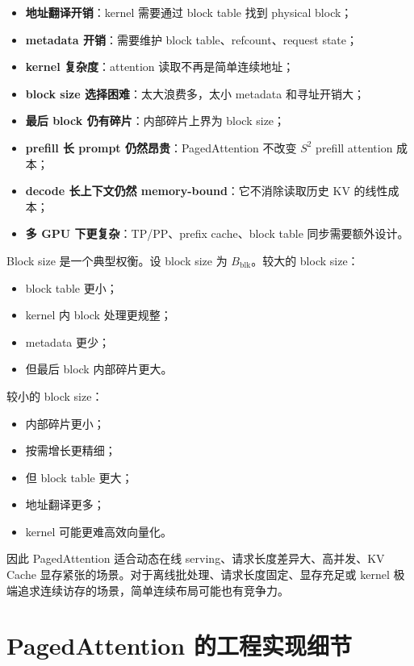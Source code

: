\begin{itemize}
\item \textbf{地址翻译开销}：kernel 需要通过 block table 找到 physical block；
\item \textbf{metadata 开销}：需要维护 block table、refcount、request state；
\item \textbf{kernel 复杂度}：attention 读取不再是简单连续地址；
\item \textbf{block size 选择困难}：太大浪费多，太小 metadata 和寻址开销大；
\item \textbf{最后 block 仍有碎片}：内部碎片上界为 block size；
\item \textbf{prefill 长 prompt 仍然昂贵}：PagedAttention 不改变 $S^2$ prefill attention 成本；
\item \textbf{decode 长上下文仍然 memory-bound}：它不消除读取历史 KV 的线性成本；
\item \textbf{多 GPU 下更复杂}：TP/PP、prefix cache、block table 同步需要额外设计。
\end{itemize}

Block size 是一个典型权衡。设 block size 为 $B_{\mathrm{blk}}$。较大的 block size：

\begin{itemize}
\item block table 更小；
\item kernel 内 block 处理更规整；
\item metadata 更少；
\item 但最后 block 内部碎片更大。
\end{itemize}

较小的 block size：

\begin{itemize}
\item 内部碎片更小；
\item 按需增长更精细；
\item 但 block table 更大；
\item 地址翻译更多；
\item kernel 可能更难高效向量化。
\end{itemize}

因此 PagedAttention 适合动态在线 serving、请求长度差异大、高并发、KV Cache 显存紧张的场景。对于离线批处理、请求长度固定、显存充足或 kernel 极端追求连续访存的场景，简单连续布局可能也有竞争力。

\section{PagedAttention 的工程实现细节}
\label{sec:pagedattention-engineering-details}


